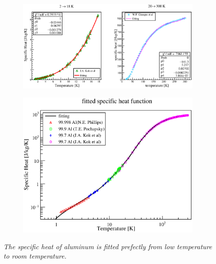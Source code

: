   \begin{figure}[H]
   \begin{subfigure}{0.3\textwidth}
    \centering
	\includegraphics[scale=0.43]{chapter5/fig/alspheat.eps}
   \end{subfigure}
   \hspace{0.2\textwidth}
   \begin{subfigure}{0.3\textwidth}
    \centering
	\includegraphics[scale=0.43]{chapter5/fig/alspheat2.eps}
   \end{subfigure}
   \caption{\it The specific heat of aluminum is fitted prefectly from low temperature to room temperature.}
   \label{4alsh2}
  \end{figure}

